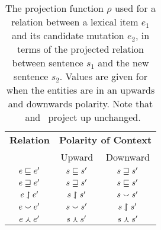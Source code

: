 \begin{table}[t]
	\begin{center}
	\begin{tabular}{c|cc}
    \textbf{Relation} & \multicolumn{2}{c}{\textbf{Polarity of Context}} \\
             & Upward & Downward \\
    \hline
     $e \sqsubseteq e'    $ & $s \sqsubseteq     s'$ & $s \sqsupseteq     s'$ \\ 
     $e \sqsupseteq e'    $ & $s \sqsupseteq     s'$ & $s \sqsubseteq     s'$ \\ 
     $e \downharpoonleft\hspace{-1.25mm}\upharpoonright e'  $ & $s \downharpoonleft\hspace{-1.25mm}\upharpoonright   s'$ & $s \smallsmile       s'$ \\ 
     $e \smallsmile e'      $ & $s \smallsmile       s'$ & $s \downharpoonleft\hspace{-1.25mm}\upharpoonright   s'$ \\ 
     $e \curlywedge e'     $ & $s \curlywedge      s'$ & $s \curlywedge      s'$ \\ 
	\end{tabular}
	\caption{
    The projection function $\rho$ used for a relation between
       a lexical item $e_1$ and
      its candidate mutation $e_2$, in terms of the projected relation
      between sentence $s_1$ and the new sentence $s_2$.
    Values are given for when the entities are in an upwards and
      downwards polarity.
    Note that \equivalent\ and \independent\ project up unchanged.
		\label{tab:projectivity}
	}
	\end{center}
\end{table}



%
%


